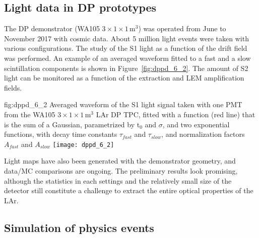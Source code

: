 \subsection{Light data in DP prototypes}
\label{sec:fddp-pd-6.2}

The DP demonstrator (WA105 $3\times1\times1$\,m$^3$) was operated from June to November 2017 with cosmic data. About \num{5} million light events were taken with various configurations. The study of the S1 light as a function of the drift field was performed. An example of an averaged waveform fitted to a fast and a slow scintillation components is shown in Figure~\ref{fig:dppd_6_2}. The amount of S2 light can be monitored as a function of the extraction and LEM amplification fields.

\begin{dunefigure}{fig:dppd_6_2}
{Averaged waveform of the S1 light signal taken with one PMT from the WA105 $3\times1\times1$\,m$^3$ LAr DP TPC, fitted with a function (red line) that is the sum of a Gaussian, parametrized by t$_0$ and $\sigma$, and two exponential functions, with decay time constants $\tau_{fast}$ and $\tau_{slow}$, and normalization factors $A_{fast}$ and $A_{slow}$}
\texttt{[image: dppd\_6\_2]}
\end{dunefigure}

Light maps have also been generated with the demonstrator geometry, and data/MC comparisons are ongoing. The preliminary results look promising, although the statistics in each settings and the relatively small size of the detector still constitute a challenge to extract the entire optical properties of the LAr.

\subsection{Simulation of physics events}
\label{sec:fddp-pd-6.3}


